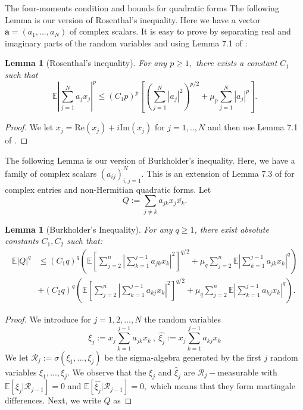 \documentclass[11pt, a4paper, oneside]{book}
\numberwithin{equation}{chapter}
\newcommand{\E}{\mathbb E}
\newcommand{\beq}{\begin{equation}}
\newcommand{\eeq}{\end{equation}}
\newtheorem{lem}[thm]{Lemma}
\begin{document}
\begin{section}{The four-moments condition and bounds for quadratic forms}
The following Lemma is our version of Rosenthal's inequality. Here we have a vector $\mathbf{a}=(a_1,...,a_N)$ of complex scalars. It is easy to prove by separating real and imaginary parts of the random variables and using Lemma 7.1 of \cite{gotze2016optimal}:
%
\begin{lem}[Rosenthal's inequality] \label{l:rosenthal} For any $p \geq 1,$ there exists a constant $C_1$ such that
\beq
\E \left | \sum_{j=1}^N a_j x_j \right |^{p} \leq (C_1 p)^p \left [ \left(\sum_{j=1}^N |a_j|^2\right)^{p/2}+ \mu_{p}\sum_{j=1}^N|a_j|^p \right ].
\eeq
\end{lem}
%
\begin{proof}
    We let $x_j = \mathrm{Re}(x_j) + i \mathrm{Im} (x_j)$ for $j=1,..,N$ and then use Lemma 7.1 of \cite{gotze2016optimal}.
\end{proof}
%
The following Lemma is our version of Burkholder's inequality. Here, we have a family of complex scalars $(a_{ij})_{i,j=1}^N$. This is an extension of Lemma 7.3 of \cite{gotze2016optimal} for complex entries and non-Hermitian quadratic forms. Let $$Q := \sum \limits_{j \neq k}a_{jk}x_j \overline{x_k}.$$
%
\begin{lem}[Burkholder's Inequality]\label{l:burkholder}
For any $q\geq 1$, there exist absolute constants $C_1, C_2$ such that:
\begin{align*}
\E |Q|^q &\leq (C_1q)^q \left ( \E \left [ \sum \limits_{j=2}^n \left | \sum \limits_{k=1}^{j-1} a_{jk} x_k \right |^2 \right ]^{q/2} + \mu_{q} \sum \limits_{j=2}^n \E \left | \sum \limits_{k=1}^{j-1} a_{jk} x_k \right |^q \right ) \\
&+ (C_2q)^q \left ( \E \left [ \sum \limits_{j=2}^n \left | \sum \limits_{k=1}^{j-1} a_{kj} x_k \right |^2 \right ]^{q/2} + \mu_{q} \sum \limits_{j=2}^n \E \left | \sum \limits_{k=1}^{j-1} a_{kj} x_k \right |^q \right ) .
\end{align*}
\end{lem}
%
\begin{proof}
We introduce for $j=1,2,...,N$ the random variables
%
\beq
\xi_j := x_j \sum_{k=1}^{j-1} a_{jk} x_k \ , \ \widehat{\xi_j} := x_j \sum_{k=1}^{j-1} a_{kj} x_k
\eeq
%
We let $\mathcal{R}_j := \sigma( \xi_1,...,\xi_j )$ be the sigma-algebra generated by the first $j$ random variables $\xi_1,...,\xi_j$. We observe that the $\xi_j$ and $\widehat{\xi}_j $ are $\mathcal{R}_j-$measurable with $\E [ \xi_j | \mathcal{R}_{j-1} ] = 0$ and $\E [ \widehat{\xi_j} | \mathcal{R}_{j-1} ] = 0,$ which means that they form martingale differences. Next, we write $Q$ as

\end{proof}
\end{section}
\end{document}
